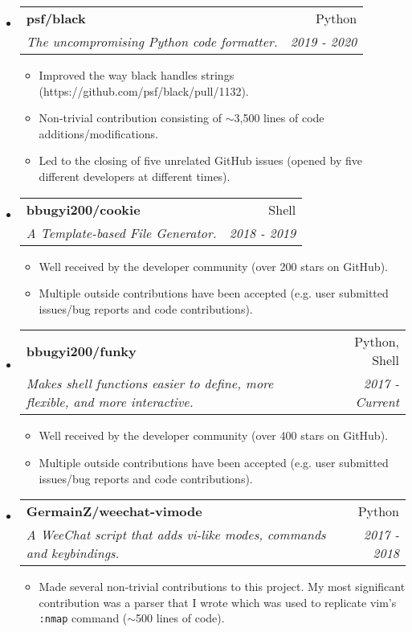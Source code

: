 \documentclass[letterpaper,11pt]{article}
\makeatletter
\newcommand{\ressubheading}[4]{
\begin{tabular*}{6.5in}{l@{\cftdotfill{\cftsecdotsep}\extracolsep{\fill}}r}
		\textbf{#1} & #2 \\
		\textit{#3} & \textit{#4} \\
\end{tabular*}\vspace{-6pt}}
\makeatother
\begin{document}
\begin{itemize}
\item \ressubheading{psf/black}{Python}{The uncompromising Python code formatter.}{2019 - 2020}
    \begin{itemize}
        \item
            Improved the way black handles strings (https://github.com/psf/black/pull/1132).
        \item
            Non-trivial contribution consisting of $\sim$3,500 lines of code additions/modifications.
        \item
            Led to the closing of five unrelated GitHub issues (opened by five different developers at different times).
    \end{itemize}
\item \ressubheading{bbugyi200/cookie}{Shell}{A Template-based File Generator.}{2018 - 2019}
    \begin{itemize}
        \item
            Well received by the developer community (over 200 stars on GitHub).
        \item
            Multiple outside contributions have been accepted (e.g. user submitted issues/bug reports and code contributions).
    \end{itemize}
\item \ressubheading{bbugyi200/funky}{Python, Shell}{Makes shell functions easier to define, more flexible, and more interactive.}{2017 - Current}
    \begin{itemize}
        \item
            Well received by the developer community (over 400 stars on GitHub).
        \item
            Multiple outside contributions have been accepted (e.g. user submitted issues/bug reports and code contributions).
    \end{itemize}
\item \ressubheading{GermainZ/weechat-vimode}{Python}{A WeeChat script that adds vi-like modes, commands and keybindings.}{2017 - 2018}
    \begin{itemize}
        \item
            Made several non-trivial contributions to this project. My most significant contribution was a parser that I wrote which was used to replicate vim's \texttt{:nmap} command ($\sim$500 lines of code).
    \end{itemize}
\end{itemize}
\end{document}
